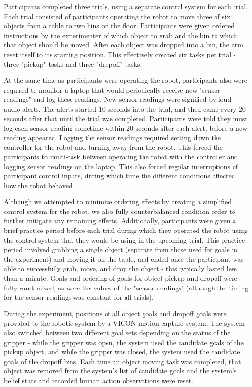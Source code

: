 \documentclass[conference]{IEEEtran}
\begin{document}
Participants completed three trials, using a separate control system for each trial. Each trial consisted of participants operating the robot to move three of six objects from a table to two bins on the floor. Participants were given ordered instructions by the experimenter of which object to grab and the bin to which that object should be moved. After each object was dropped into a bin, the arm reset itself to its starting position. This effectively created six tasks per trial - three "pickup" tasks and three "dropoff" tasks. 

At the same time as participants were operating the robot, participants also were required to monitor a laptop that would periodically receive new "sensor readings" and log these readings. New sensor readings were signified by loud audio alerts. The alerts started 10 seconds into the trial, and then came every 20 seconds after that until the trial was completed. Participants were told they must log each sensor reading sometime within 20 seconds after each alert, before a new reading appeared. Logging the sensor readings required setting down the controller for the robot and turning away from the robot. This forced the participants to multi-task between operating the robot with the controller and logging sensor readings on the laptop. This also forced regular interruptions of participant control inputs, during which time the different conditions affected how the robot behaved.

Although we attempted to minimize ordering effects by creating a simplified control system for the robot, we also fully counterbalanced condition order to further mitigate any remaining effects. Additionally, participants were given a brief practice period before each trial during which they operated the robot using the control system that they would be using in the upcoming trial. This practice period involved grabbing a single object (separate from those used for goals in the experiment) and moving it on the table, and ended once the participant was able to successfully grab, move, and drop the object - this typically lasted less than a minute. Goals and ordering of goals for object pickup and dropoff were fully randomized, as were the values of the "sensor readings" (although the timing for the sensor readings was constant for all trials).

During the experiment, positions of all object goals and dropoff goals were provided to the robotic system by a VICON motion capture system. The system also switched between two different goal sets depending on the status of the gripper - while the gripper was open, the system used the candidate goals of the pickup object, and while the gripper was closed, the system used the candidate goals of the dropoff bins. Each time an object moving task was completed, that object was removed from the system's list of candidate goals and the system's belief state and recorded human action observations were reset.
\end{document}
